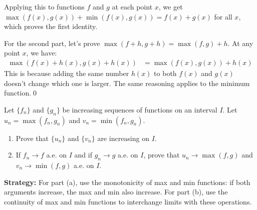 Applying this to functions $f$ and $g$ at each point $x$, we get $\max(f(x), g(x)) + \min(f(x), g(x)) = f(x) + g(x)$ for all $x$, which proves the first identity.

For the second part, let's prove $\max(f + h, g + h) = \max(f, g) + h$. At any point $x$, we have:
\begin{align*}
\max(f(x) + h(x), g(x) + h(x)) &= \max(f(x), g(x)) + h(x)
\end{align*}
This is because adding the same number $h(x)$ to both $f(x)$ and $g(x)$ doesn't change which one is larger. The same reasoning applies to the minimum function.\qed


\begin{problembox}
\begin{problemstatement}
Let $\{f_n\}$ and $\{g_n\}$ be increasing sequences of functions on an interval $I$. Let $u_n = \max(f_n, g_n)$ and $v_n = \min(f_n, g_n)$.
\begin{enumerate}[label=(\alph*)]
\item Prove that $\{u_n\}$ and $\{v_n\}$ are increasing on $I$.
\item If $f_n \to f$ a.e. on $I$ and if $g_n \to g$ a.e. on $I$, prove that $u_n \to \max(f, g)$ and $v_n \to \min(f, g)$ a.e. on $I$.
\end{enumerate}
\end{problemstatement}
\end{problembox}

\noindent\textbf{Strategy:} For part (a), use the monotonicity of max and min functions: if both arguments increase, the max and min also increase. For part (b), use the continuity of max and min functions to interchange limits with these operations.

